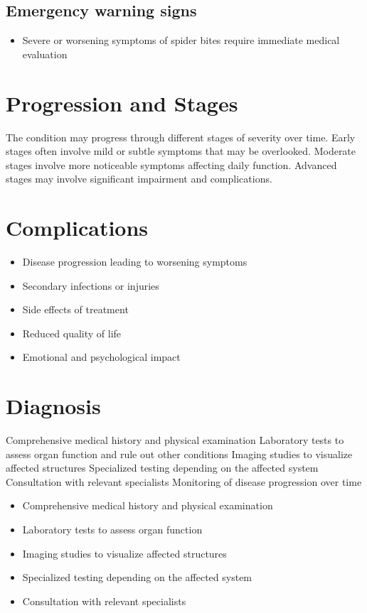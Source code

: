 \subsection{Emergency warning signs}
\begin{itemize}[noitemsep]
  \item Severe or worsening symptoms of spider bites require immediate medical evaluation
\end{itemize}
\section{Progression and Stages}
The condition may progress through different stages of severity over time. Early stages often involve mild or subtle symptoms that may be overlooked. Moderate stages involve more noticeable symptoms affecting daily function. Advanced stages may involve significant impairment and complications.
\section{Complications}
\begin{itemize}[noitemsep]
  \item Disease progression leading to worsening symptoms
  \item Secondary infections or injuries
  \item Side effects of treatment
  \item Reduced quality of life
  \item Emotional and psychological impact
\end{itemize}
\section{Diagnosis}
Comprehensive medical history and physical examination Laboratory tests to assess organ function and rule out other conditions Imaging studies to visualize affected structures Specialized testing depending on the affected system Consultation with relevant specialists Monitoring of disease progression over time

\begin{itemize}[noitemsep]
  \item Comprehensive medical history and physical examination
  \item Laboratory tests to assess organ function
  \item Imaging studies to visualize affected structures
  \item Specialized testing depending on the affected system
  \item Consultation with relevant specialists
\end{itemize}
